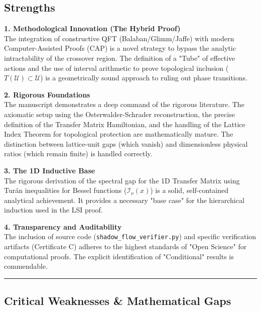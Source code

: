 \subsection*{Strengths}

\textbf{1. Methodological Innovation (The Hybrid Proof)} \\
The integration of constructive QFT (Balaban/Glimm/Jaffe) with modern Computer-Assisted Proofs (CAP) is a novel strategy to bypass the analytic intractability of the crossover region. The definition of a "Tube" of effective actions and the use of interval arithmetic to prove topological inclusion ($T(\mathcal{U}) \subset \mathcal{U}$) is a geometrically sound approach to ruling out phase transitions.

\textbf{2. Rigorous Foundations} \\
The manuscript demonstrates a deep command of the rigorous literature. The axiomatic setup using the Osterwalder-Schrader reconstruction, the precise definition of the Transfer Matrix Hamiltonian, and the handling of the Lattice Index Theorem for topological protection are mathematically mature. The distinction between lattice-unit gaps (which vanish) and dimensionless physical ratios (which remain finite) is handled correctly.

\textbf{3. The 1D Inductive Base} \\
The rigorous derivation of the spectral gap for the 1D Transfer Matrix using Turán inequalities for Bessel functions ($\mathcal{I}_\nu(x)$) is a solid, self-contained analytical achievement. It provides a necessary "base case" for the hierarchical induction used in the LSI proof.

\textbf{4. Transparency and Auditability} \\
The inclusion of source code (\texttt{shadow\_flow\_verifier.py}) and specific verification artifacts (Certificate C) adheres to the highest standards of "Open Science" for computational proofs. The explicit identification of "Conditional" results is commendable.

\hrule

\subsection*{Critical Weaknesses \& Mathematical Gaps}

